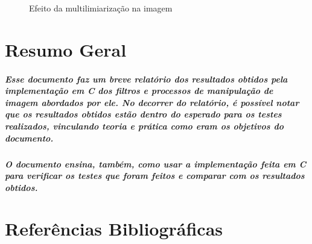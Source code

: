 \documentclass[12pt,fleqn]{article}
\begin{document}
  \begin{figure}[!htb]
  \centering
  \caption{Efeito da multilimiarização na imagem}
  \label{fig:Resultado 1}
  \end{figure}

\section{Resumo Geral}

  \subparagraph{\normalfont Esse documento faz um breve relatório dos resultados obtidos pela implementação em C dos filtros e processos de manipulação de imagem abordados por ele. 
  No decorrer do relatório, é possível notar que os resultados obtidos estão dentro do esperado para os testes realizados, vinculando teoria e prática como eram
  os objetivos do documento.}

  \subparagraph{\normalfont O documento ensina, também, como usar a implementação feita em C para verificar os testes que foram feitos e comparar com os
  resultados obtidos.}

\section{Referências Bibliográficas}
\end{document}
